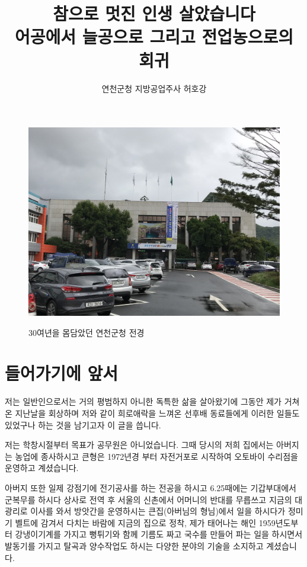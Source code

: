 \documentclass[chapter,book,openany,twoside]{oblivoir}
\begin{document}
\pagestyle{empty}
\title{참으로 멋진 인생 살았습니다 \\{\large 어공에서 늘공으로 그리고 전업농으로의 회귀}}
\author{연천군청 지방공업주사 허호강}


\maketitle

\begin{figure}[h]
\centering \includegraphics[scale=0.08]{DBs/pic/001.jpg}\\
\caption{30여년을 몸담았던 연천군청 전경}
\end{figure}
\newpage
{}
\pagestyle{KNUworkshop}

\chapter{들어가기에 앞서}

저는 일반인으로서는 거의 평범하지 아니한 독특한 삶을 살아왔기에 그동안 제가 거쳐 온 지난날을 회상하며 저와 같이 희로애락을 느껴온 선후배 동료들에게 이러한 일들도 있었구나 하는 것을 남기고자 이 글을 씁니다.

저는 학창시절부터 목표가 공무원은 아니었습니다. 그때 당시의 저희 집에서는 아버지는 농업에 종사하시고 큰형은 1972년경 부터 자전거포로 시작하여 오토바이 수리점을 운영하고 계셨습니다.

아버지 또한 일제 강점기에 전기공사를 하는 전공을 하시고 6.25때에는 기갑부대에서 군복무를 하시다 상사로 전역 후 서울의 신촌에서 어머니의 반대를 무릅쓰고 지금의 대광리로 이사를 와서 방앗간을 운영하시는 큰집(아버님의 형님)에서 일을 하시다가 정미기 벨트에 감겨서 다치는 바람에 지금의 집으로 정착, 제가 태어나는 해인 1959년도부터 강냉이기계를 가지고 뻥튀기와 함께 기름도 짜고 국수를 만들어 파는 일을 하시면서 발동기를 가지고 탈곡과 양수작업도 하시는 다양한 분야의 기술을 소지하고 계셨습니다.
\end{document}
